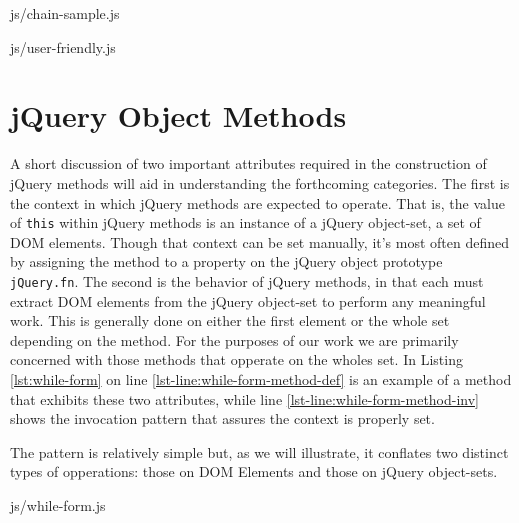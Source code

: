 \documentclass[preprint, leqno]{sigplanconf}
\begin{document}
\begin{bottom}
\begin{lstinputlisting}[
    language=JavaScript,
    caption={Sample method chain},
    label={lst:chain-sample}
]{js/chain-sample.js}
\end{lstinputlisting}

\begin{lstinputlisting}[
    language=JavaScript,
    caption={User friendly overhead},
    label={lst:user-friendly}
]{js/user-friendly.js}
\end{lstinputlisting}
\end{bottom}

\section{jQuery Object Methods}

A short discussion of two important attributes required in the construction of jQuery methods will aid in understanding the forthcoming categories. The first is the context in which jQuery methods are expected to operate. That is, the value of \verb|this| within jQuery methods is an instance of a jQuery object-set, a set of DOM elements. Though that context can be set manually, it's most often defined by assigning the method to a property on the jQuery object prototype \verb|jQuery.fn|. The second is the behavior of jQuery methods, in that each must extract DOM elements from the jQuery object-set to perform any meaningful work. This is generally done on either the first element or the whole set depending on the method. For the purposes of our work we are primarily concerned with those methods that opperate on the wholes set. In Listing \ref{lst:while-form} on line \ref{lst-line:while-form-method-def} is an example of a method that exhibits these two attributes, while line \ref{lst-line:while-form-method-inv} shows the invocation pattern that assures the context is properly set.

The pattern is relatively simple but, as we will illustrate, it conflates two distinct types of opperations: those on DOM Elements and those on jQuery object-sets.

\begin{top}
\begin{lstinputlisting}[
    language=JavaScript,
    caption={Sample jQuery method},
    label={lst:while-form},
    escapeinside={@}{@}
]{js/while-form.js}
\end{lstinputlisting}
\end{top}
\end{document}
